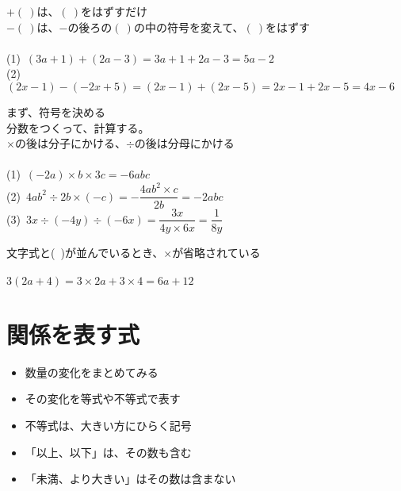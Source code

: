 \documentclass[11pt]{article}
\begin{document}
\begin{tcolorbox}[mybox={式の加減}]
$+(\ )$は、$(\ )$をはずすだけ\\
$-(\ )$は、$-$の後ろの$(\ )$の中の符号を変えて、$(\ )$をはずす\\

\\
(1)\ $(3a+1) + (2a-3) = 3a+1 + 2a-3 = 5a-2$\\
(2)\ $(2x-1) - (-2x+5) = (2x-1) + (2x-5) = 2x-1 + 2x-5 =4x -6$
\end{tcolorbox}

\begin{tcolorbox}[mybox={3つの乗除}]
まず、符号を決める\\
分数をつくって、計算する。\\
$\times$の後は分子にかける、$\div$の後は分母にかける\\

\\
(1)\ $(-2a) \times b \times 3c = -6abc$\\

(2)\ $4ab^2 \div 2 b  \times (-c) = - \dfrac{4ab^2 \times c}{2b} = -2abc$\\

(3)\ $3x \div (-4y) \div (-6x) = \dfrac{3x}{4y \times 6x} =\dfrac{1}{8y}$
\end{tcolorbox}

\begin{tcolorbox}[mybox={分配法則}]
文字式と(\ )が並んでいるとき、$\times$が省略されている\\

\\
$3(2a+4)=3 \times 2a + 3 \times 4 =6a+12$
\end{tcolorbox}


\section{関係を表す式}
\begin{tcolorbox}[mybox={関係を表す式の作り方}]
\begin{itemize}
\item 数量の変化をまとめてみる
\item その変化を等式や不等式で表す
\end{itemize}
\end{tcolorbox}

\begin{tcolorbox}[mybox={不等号に関する注意}]
\begin{itemize}
\item 不等式は、大きい方にひらく記号
\item 「以上、以下」は、その数も含む
\item 「未満、より大きい」はその数は含まない
\end{itemize}
\end{tcolorbox}
\end{document}
